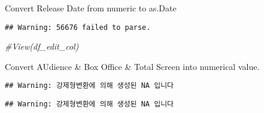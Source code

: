 \documentclass[
]{article}
\newenvironment{Shaded}{\begin{snugshade}}{\end{snugshade}}
\newcommand{\CommentTok}[1]{\textcolor[rgb]{0.56,0.35,0.01}{\textit{#1}}}
\newcommand{\FunctionTok}[1]{\textcolor[rgb]{0.00,0.00,0.00}{#1}}
\newcommand{\NormalTok}[1]{#1}
\newcommand{\OtherTok}[1]{\textcolor[rgb]{0.56,0.35,0.01}{#1}}
\newcommand{\SpecialCharTok}[1]{\textcolor[rgb]{0.00,0.00,0.00}{#1}}
\begin{document}
Convert Release Date from numeric to as.Date

\begin{Shaded}
\end{Shaded}

\begin{verbatim}
## Warning: 56676 failed to parse.
\end{verbatim}

\begin{Shaded}
\begin{Highlighting}[]
\CommentTok{\#View(df\_edit\_col)}
\end{Highlighting}
\end{Shaded}

Convert AUdience \& Box Office \& Total Screen into numerical value.

\begin{Shaded}
\end{Shaded}

\begin{verbatim}
## Warning: 강제형변환에 의해 생성된 NA 입니다
\end{verbatim}

\begin{Shaded}
\end{Shaded}

\begin{verbatim}
## Warning: 강제형변환에 의해 생성된 NA 입니다
\end{verbatim}

\begin{Shaded}
\end{Shaded}
\end{document}
